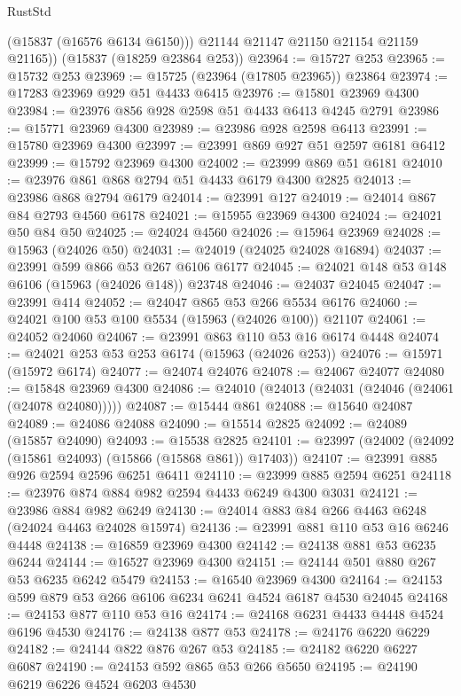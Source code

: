 \begin{lexlean}{RustStd}
\begin{coremodule}
{\begin{coremodule}
{{{{{{{{{{{{{{{{{{{{{{{{{{{{{{{{{{{{{{{{{{{{{{{{{{{{{{{{{{{{          (@15837 (@16576 @6134 @6150)))
        @21144
        @21147
        @21150
        @21154
        @21159
        @21165))
    (@15837 (@18259 @23864 @253))
@23964 := @15727 @253
@23965 := @15732 @253
@23969 := @15725 (@23964 (@17805 @23965)) @23864
@23974 := @17283 @23969 @929 @51 @4433 @6415
@23976 := @15801 @23969 @4300
@23984 := @23976 @856 @928 @2598 @51 @4433 @6413 @4245 @2791
@23986 := @15771 @23969 @4300
@23989 := @23986 @928 @2598 @6413
@23991 := @15780 @23969 @4300
@23997 := @23991 @869 @927 @51 @2597 @6181 @6412
@23999 := @15792 @23969 @4300
@24002 := @23999 @869 @51 @6181
@24010 := @23976 @861 @868 @2794 @51 @4433 @6179 @4300 @2825
@24013 := @23986 @868 @2794 @6179
@24014 := @23991 @127
@24019 := @24014 @867 @84 @2793 @4560 @6178
@24021 := @15955 @23969 @4300
@24024 := @24021 @50 @84 @50
@24025 := @24024 @4560
@24026 := @15964 @23969
@24028 := @15963 (@24026 @50)
@24031 := @24019 (@24025 @24028 @16894)
@24037 := @23991 @599 @866 @53 @267 @6106 @6177
@24045 := @24021 @148 @53 @148 @6106 (@15963 (@24026 @148)) @23748
@24046 := @24037 @24045
@24047 := @23991 @414
@24052 := @24047 @865 @53 @266 @5534 @6176
@24060 := @24021 @100 @53 @100 @5534 (@15963 (@24026 @100)) @21107
@24061 := @24052 @24060
@24067 := @23991 @863 @110 @53 @16 @6174 @4448
@24074 := @24021 @253 @53 @253 @6174 (@15963 (@24026 @253))
@24076 := @15971 (@15972 @6174)
@24077 := @24074 @24076
@24078 := @24067 @24077
@24080 := @15848 @23969 @4300
@24086 := @24010 (@24013 (@24031 (@24046 (@24061 (@24078 @24080)))))
@24087 := @15444 @861
@24088 := @15640 @24087
@24089 := @24086 @24088
@24090 := @15514 @2825
@24092 := @24089 (@15857 @24090)
@24093 := @15538 @2825
@24101 := @23997 (@24002 (@24092 (@15861 @24093) (@15866 (@15868 @861)) @17403))
@24107 := @23991 @885 @926 @2594 @2596 @6251 @6411
@24110 := @23999 @885 @2594 @6251
@24118 := @23976 @874 @884 @982 @2594 @4433 @6249 @4300 @3031
@24121 := @23986 @884 @982 @6249
@24130 := @24014 @883 @84 @266 @4463 @6248 (@24024 @4463 @24028 @15974)
@24136 := @23991 @881 @110 @53 @16 @6246 @4448
@24138 := @16859 @23969 @4300
@24142 := @24138 @881 @53 @6235 @6244
@24144 := @16527 @23969 @4300
@24151 := @24144 @501 @880 @267 @53 @6235 @6242 @5479
@24153 := @16540 @23969 @4300
@24164 := @24153 @599 @879 @53 @266 @6106 @6234 @6241 @4524 @6187 @4530 @24045
@24168 := @24153 @877 @110 @53 @16
@24174 := @24168 @6231 @4433 @4448 @4524 @6196 @4530
@24176 := @24138 @877 @53
@24178 := @24176 @6220 @6229
@24182 := @24144 @822 @876 @267 @53
@24185 := @24182 @6220 @6227 @6087
@24190 := @24153 @592 @865 @53 @266 @5650
@24195 := @24190 @6219 @6226 @4524 @6203 @4530
}}}}}}}}}}}}}}}}}}}}}}}}}}}}}}}}}}}}}}}}}}}}}}}}}}}}}}}}}}}}
\end{coremodule}}
\end{coremodule}
\end{lexlean}
